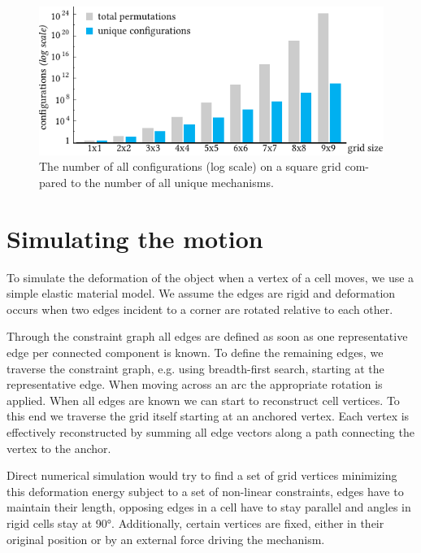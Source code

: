 \begin{figure} [h]
    \includegraphics[width=\textwidth]{chapters/understanding-metamaterial-mechanisms-FIG/11-search-space-reduction.pdf}
    \caption[Short figure name.]{The number of all configurations (log scale) on a square grid com-pared to the number of all unique mechanisms. 
    \label{fig:11-search-space-reduction}}
\end{figure}


\section{Simulating the motion}
\label{section:simulation}

To simulate the deformation of the object when a vertex of a cell moves, we use a simple elastic material model. We assume the edges are rigid and deformation occurs when two edges incident to a corner are rotated relative to each other. 

Through the constraint graph all edges are defined as soon as one representative edge per connected component is known. To define the remaining edges, we traverse the constraint graph, e.g. using breadth-first search, starting at the representative edge. When moving across an arc the appropriate rotation is applied. When all edges are known we can start to reconstruct cell vertices. To this end we traverse the grid itself starting at an anchored vertex. Each vertex is effectively reconstructed by summing all edge vectors along a path connecting the vertex to the anchor. 

Direct numerical simulation would try to find a set of grid vertices minimizing this deformation energy subject to a set of non-linear constraints, edges have to maintain their length, opposing edges in a cell have to stay parallel and angles in rigid cells stay at 90°. Additionally, certain vertices are fixed, either in their original position or by an external force driving the mechanism. 

